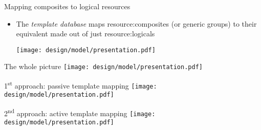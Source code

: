 \begin{frame}{Mapping composites to logical resources}
    \begin{itemize}
        \item The \textit{template database} maps \glspl{resource:composite} (or generic groups) to their equivalent made out of just \glspl{resource:logical}
        \begin{center}
            \texttt{[image: design/model/presentation.pdf]}
        \end{center}
    \end{itemize}
\end{frame}


\begin{frame}{The whole picture}
    \centering
    \texttt{[image: design/model/presentation.pdf]}
\end{frame}

\begin{frame}{1\textsuperscript{st} approach: passive template mapping}
    \centering
    \texttt{[image: design/model/presentation.pdf]}
\end{frame}

\begin{frame}{2\textsuperscript{nd} approach: active template mapping}
    \centering
    \texttt{[image: design/model/presentation.pdf]}
\end{frame}
